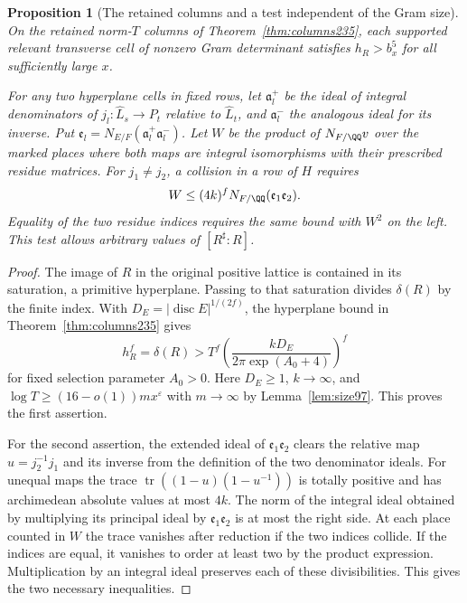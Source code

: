 \documentclass[a4paper,11pt]{article}
\newtheorem{proposition}{Proposition}[section]
\theoremstyle{definition}
\theoremstyle{remark}
\numberwithin{equation}{section}
\begin{document}
\begin{proposition}[The retained columns and a test independent of the Gram size]
\leavevmode\label{prop:retainedtest535}
On the retained norm-\(T\) columns of Theorem~\ref{thm:columns235},
each supported relevant transverse cell of nonzero Gram determinant
satisfies \(h_R>b_x^5\) for all sufficiently large \(x\).

For any two hyperplane cells in fixed rows, let
\(\mathfrak a_l^+\) be the ideal of integral denominators of
\(j_l:\widehat L_s\to P_t\) relative to \(\widehat L_t\), and
\(\mathfrak a_l^-\) the analogous ideal for its inverse. Put
\(\mathfrak e_l=N_{E/F}(\mathfrak a_l^+\mathfrak a_l^-)\).
Let \(W\) be the product of \(N_{F/\QQ}v\) over the marked
places where both maps are integral isomorphisms with their
prescribed residue matrices. For \(j_1\ne j_2\), a collision
in a row of \(H\) requires
\[
       W\le(4k)^f N_{F/\QQ}(\mathfrak e_1\mathfrak e_2).
\]
Equality of the two residue indices requires the same bound
with \(W^2\) on the left. This test allows arbitrary values
of \([R^\sharp:R]\).
\end{proposition}
\begin{proof}
The image of \(R\) in the original positive lattice is contained
in its saturation, a primitive hyperplane. Passing to that
saturation divides \(\delta(R)\) by the finite index. With
\(D_E=|\operatorname{disc}E|^{1/(2f)}\), the hyperplane bound
in Theorem~\ref{thm:columns235} gives
\[
      h_R^f=\delta(R)>
        T^f\left(\frac{kD_E}{2\pi\exp(A_0+4)}\right)^f
\]
for fixed selection parameter \(A_0>0\).
Here \(D_E\ge1\), \(k\to\infty\), and
\(\log T\ge(16-o(1))m x^\varepsilon\) with \(m\to\infty\)
by Lemma~\ref{lem:size97}. This proves the first assertion.

For the second assertion, the extended ideal of
\(\mathfrak e_1\mathfrak e_2\) clears the relative map
\(u=j_2^{-1}j_1\) and its inverse from the definition of the
two denominator ideals. For unequal maps the trace
\(\operatorname{tr}((1-u)(1-u^{-1}))\) is totally positive
and has archimedean absolute values at most \(4k\). The norm of
the integral ideal obtained by multiplying its principal ideal
by \(\mathfrak e_1\mathfrak e_2\) is at most the right side.
At each place counted in \(W\) the trace vanishes after reduction
if the two indices collide. If the indices are equal, it vanishes
to order at least two by the product expression. Multiplication
by an integral ideal preserves each of these divisibilities.
This gives the two necessary inequalities.
\end{proof}
\end{document}
